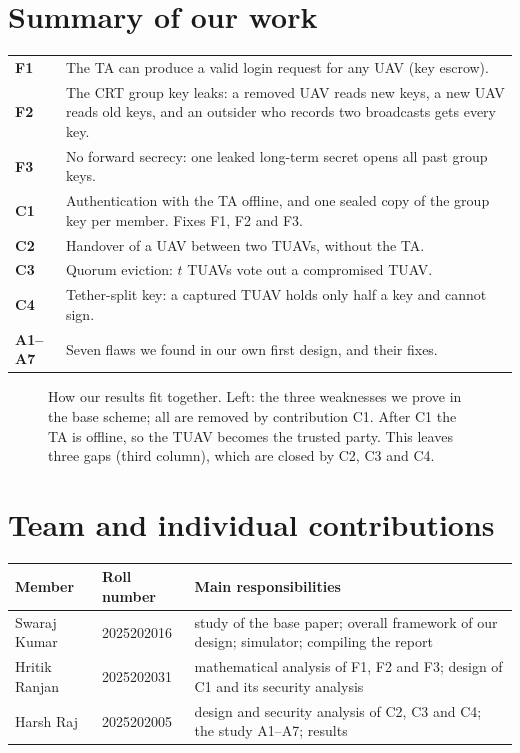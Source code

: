 \documentclass[11pt,openany]{report}
\begin{document}
\section{Summary of our work}
\begin{center}
\small
\begin{tabularx}{\linewidth}{@{}l X@{}}
\toprule
\textbf{F1} & The TA can produce a valid login request for any UAV (key escrow).\\
\textbf{F2} & The CRT group key leaks: a removed UAV reads new keys, a new UAV reads old keys, and an outsider who records two broadcasts gets every key.\\
\textbf{F3} & No forward secrecy: one leaked long-term secret opens all past group keys.\\
\midrule
\textbf{C1} & Authentication with the TA offline, and one sealed copy of the group key per member. Fixes F1, F2 and F3.\\
\textbf{C2} & Handover of a UAV between two TUAVs, without the TA.\\
\textbf{C3} & Quorum eviction: $t$ TUAVs vote out a compromised TUAV.\\
\textbf{C4} & Tether-split key: a captured TUAV holds only half a key and cannot sign.\\
\textbf{A1--A7} & Seven flaws we found in our own first design, and their fixes.\\
\bottomrule
\end{tabularx}
\end{center}

\begin{figure}[H]
\centering

\caption{How our results fit together. Left: the three weaknesses we prove in the base scheme; all are removed by contribution C1. After C1 the TA is
offline, so the TUAV becomes the trusted party. This leaves three gaps (third column), which are closed by C2, C3 and C4.}
\label{fig:map}
\end{figure}

\section{Team and individual contributions}
\begin{center}
\small
\begin{tabularx}{\linewidth}{@{}l l X@{}}
\toprule
\textbf{Member} & \textbf{Roll number} & \textbf{Main responsibilities}\\
\midrule
Swaraj Kumar & 2025202016 & study of the base paper; overall framework of our design; simulator; compiling the report\\
Hritik Ranjan & 2025202031 & mathematical analysis of F1, F2 and F3; design of C1 and its security analysis\\
Harsh Raj & 2025202005 & design and security analysis of C2, C3 and C4; the study A1--A7; results\\
\bottomrule
\end{tabularx}
\end{center}
\end{document}
